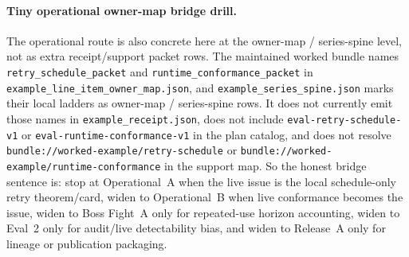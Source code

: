 \documentclass[11pt]{article}
\begin{document}
\paragraph{Tiny operational owner-map bridge drill.}
The operational route is also concrete here at the owner-map / series-spine level, not as extra receipt/support packet rows. The maintained worked bundle names \nolinkurl{retry\_schedule\_packet} and \nolinkurl{runtime\_conformance\_packet} in \nolinkurl{example\_line\_item\_owner\_map.json}, and \nolinkurl{example\_series\_spine.json} marks their local ladders as owner-map / series-spine rows. It does not currently emit those names in \nolinkurl{example\_receipt.json}, does not include \nolinkurl{eval-retry-schedule-v1} or \nolinkurl{eval-runtime-conformance-v1} in the plan catalog, and does not resolve \nolinkurl{bundle://worked-example/retry-schedule} or \nolinkurl{bundle://worked-example/runtime-conformance} in the support map. So the honest bridge sentence is: stop at Operational~A when the live issue is the local schedule-only retry theorem/card, widen to Operational~B when live conformance becomes the issue, widen to Boss Fight~A only for repeated-use horizon accounting, widen to Eval~2 only for audit/live detectability bias, and widen to Release~A only for lineage or publication packaging.\cite{series:profiling,series:schedretries,series:bossfightA,series:operationalB,series:advantagecontracts,series:releaseproperty,series:workedexample}
\end{document}
